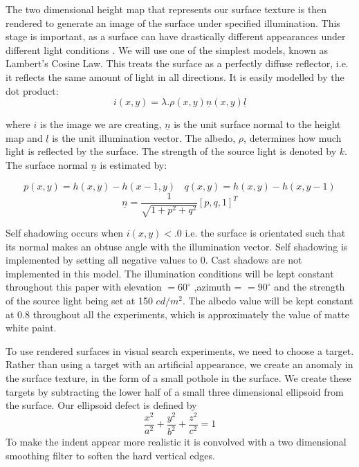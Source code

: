 \par
The two dimensional height map that represents our surface texture is then rendered to
generate an image of the surface under specified illumination. This stage is important, as a surface can have drastically different appearances under different light conditions \citep{chantler1995}. We will use one of the simplest models, known as Lambert's Cosine Law. This treats the surface as a perfectly diffuse reflector, i.e. it reflects the same amount of light in all directions. It is easily modelled by the dot product:
\begin{equation}
i(x,y) = \lambda . \rho (x,y) \underline{n}(x,y) \underline{l}
\end{equation}

where $i$ is the image we are creating, $\underline{n}$ is the unit surface normal to
the height map and $\underline{l}$ is the unit illumination vector. The albedo, $\rho$, determines how much light is reflected by the surface. The strength of the source light is denoted by $k$. The surface normal $\underline{n}$ is estimated by:

\begin{equation}
p(x,y) = h(x,y)-h(x-1,y) \ \  \  \  q(x,y)=h(x,y)-h(x,y-1)
\end{equation}
\begin{equation}
\underline{n} = \frac{1}{\sqrt{1+p^2+q^2}}[p,q,1]^T
\end{equation} 
 
Self shadowing occurs when $i(x,y)<.0$ i.e. the surface is orientated such that its normal makes an obtuse angle with the illumination vector. Self shadowing is implemented by setting all negative values to 0. Cast shadows are not implemented in this model. The illumination conditions will be kept constant throughout this paper with elevation $= 60^{\circ}$ ,azimuth = $= 90^{\circ}$ and the strength of the source light being set at 150 $cd/m^2$. The albedo value will be kept constant at 0.8 throughout all the experiments, which is approximately the value of matte white paint.
\par
To use rendered surfaces in visual search experiments, we need to choose a target. Rather than using a target with an artificial appearance, we create an anomaly in the surface texture, in the form of a small pothole in the surface. We create these targets by subtracting the lower half of a small three dimensional ellipsoid from the surface. Our ellipsoid defect is defined by
\begin{equation}
\frac{x^2}{a^2}+\frac{y^2}{b^2}+\frac{z^2}{c^2}=1
\end{equation}
To make the indent appear more realistic it is convolved with a two dimensional smoothing filter to soften the hard vertical edges.